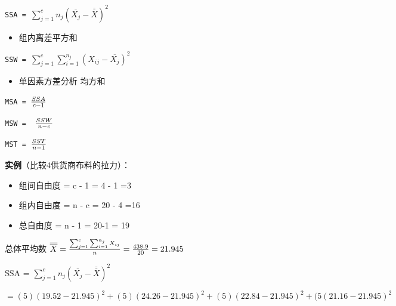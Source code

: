 \texttt{SSA~=~}\(\sum_{j=1}^c n_j(\overline{X_j} - \overline{\overline{X}})^2\)

\begin{description}
\item[]
\end{description}

\begin{itemize}
\tightlist
\item
  组内离差平方和\\
\end{itemize}

\texttt{SSW~=~}\(\sum_{j=1}^c \sum_{i=1}^{n_j} (X_{ij} - \overline{X_j})^2\)

\begin{description}
\item[]
\end{description}

\begin{itemize}
\tightlist
\item
  单因素方差分析 均方和
\end{itemize}

\texttt{MSA~=~}\({SSA \over c -1}\)

\texttt{MSW~=~~}\({SSW \over n -c}\)

\texttt{MST~=~}\({SST \over n -1}\)

\textbf{实例}（比较4供货商布料的拉力）：

\begin{itemize}
\tightlist
\item
  组间自由度 = c - 1 = 4 - 1 =3
\item
  组内自由度 = n - c = 20 - 4 =16
\item
  总自由度 = n - 1 = 20-1 = 19
\end{itemize}

总体平均数
\(\overline{\overline{X}} = {\sum_{j=1}^c \sum_{i=1}^{n_j} X_{ij} \over n} = {438.9 \over 20}= 21.945\)

SSA = \(\sum_{j=1}^c n_j(\overline{X_j} - \overline{\overline{X}})^2\)

\[= (5)(19.52 - 21.945)^2 + (5)(24.26 - 21.945)^2 + (5)(22.84 - 21.945)^2 + (5(21.16 - 21.945)^2\]

